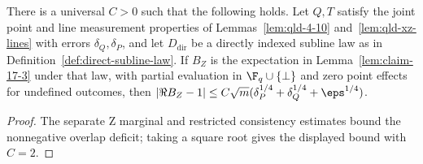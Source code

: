 \begin{lemma}
	\label{lem:claim-17-3-re-direct}
	\leanok
	There is a universal $C>0$ such that the following holds.
	Let $Q,T$ satisfy the joint point and line measurement properties of
	Lemmas~\ref{lem:qld-4-10} and~\ref{lem:qld-xz-lines} with errors
	$\delta_Q,\delta_P$, and let $D_{\mathrm{dir}}$ be a directly indexed
	subline law as in Definition~\ref{def:direct-subline-law}. If $B_Z$ is the
	expectation in Lemma~\ref{lem:claim-17-3} under that law, with partial
	evaluation in $\F_q \cup \{\bot\}$ and zero point effects for undefined
	outcomes, then
	$|\Re B_Z-1|\le
	C\sqrt m(\delta_P^{1/4}+\delta_Q^{1/4}+\eps^{1/4})$.
\end{lemma}
\begin{proof}
	\leanok
	The separate Z marginal and restricted consistency estimates bound the
	nonnegative overlap deficit; taking a square root gives the displayed
	bound with $C=2$.
\end{proof}

